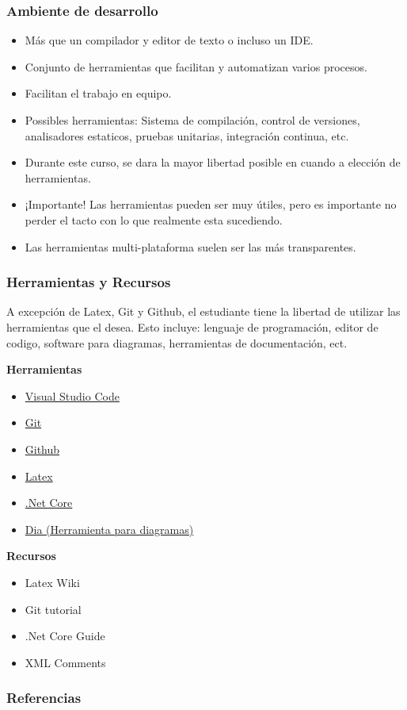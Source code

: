 \documentclass{beamer}
\begin{document}
\begin{frame}
    \frametitle{Ambiente de desarrollo}
    \begin{itemize}
    \item{M\'as que un compilador y editor de texto o incluso un IDE.}
    \item{Conjunto de herramientas que facilitan y automatizan varios procesos.}
    \item{Facilitan el trabajo en equipo.}
    \item{Possibles herramientas: Sistema de compilaci\'on, control de versiones, analisadores estaticos, pruebas unitarias, integraci\'on continua, etc.}
    \item{Durante este curso, se dara la mayor libertad posible en cuando a elecci\'on de herramientas.}
    \item{¡Importante! Las herramientas pueden ser muy \'utiles, pero es importante no perder el tacto con lo que realmente esta sucediendo.}
    \item{Las herramientas multi-plataforma suelen ser las m\'as transparentes.}
    \end{itemize}
\end{frame}

\begin{frame}
\frametitle{Herramientas y Recursos}
A excepci\'on de Latex, Git y Github, el estudiante tiene la libertad de
utilizar las herramientas que el desea. Esto incluye: lenguaje de programaci\'on,
editor de codigo, software para diagramas, herramientas de documentaci\'on, ect.

\begin{multicols*}{2}
    {\bf Herramientas} \\
\begin{itemize}
    \item \href{https://code.visualstudio.com/}{Visual Studio Code}
    \item \href{https://git-scm.com/}{Git}
    \item \href{https://github.com/}{Github}
    \item \href{https://www.latex-project.org/}{Latex}
    \item \href{https://dotnet.github.io/}{.Net Core}
    \item \href{https://wiki.gnome.org/Apps/Dia}{Dia (Herramienta para diagramas)}

\end{itemize}
\columnbreak
{\bf Recursos}
\begin{itemize}
    \item Latex Wiki \cite{Latex}
    \item Git tutorial \cite{GitTutorial}
    \item .Net Core Guide \cite{DotNetGuide}
    \item XML Comments \cite{XmlDoc}
\end{itemize}
\end{multicols*}
\end{frame}

\begin{frame}
\frametitle{Referencias}


\end{frame}
\end{document}
